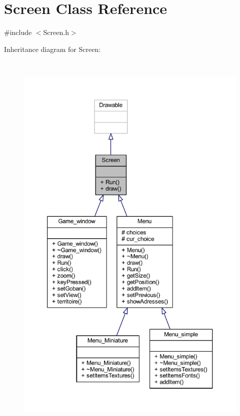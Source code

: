 \hypertarget{class_screen}{}\section{Screen Class Reference}
\label{class_screen}


{\ttfamily \#include $<$Screen.\+h$>$}



Inheritance diagram for Screen\+:\nopagebreak
\begin{figure}[H]
\begin{center}
\leavevmode
\includegraphics[height=550pt]{class_screen__inherit__graph}
\end{center}
\end{figure}


